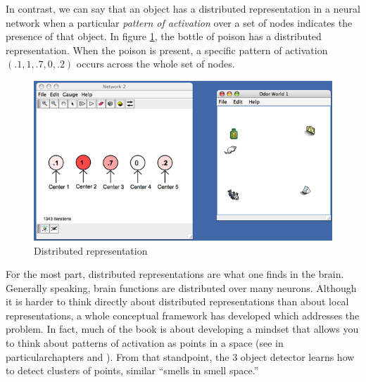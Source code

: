 In contrast, we can say that an object has a distributed representation in a neural network when a particular {\em pattern of activation} over a set of nodes indicates the presence of that object. In figure \ref{distributed},  the bottle of poison has a distributed representation. When the poison is present, a specific pattern of activation $(.1,1,.7,0,.2)$ occurs across the whole set of nodes.

\begin{figure}[h]
\centering
\includegraphics[scale=.3]{./images/Distributed_Rep.png}
\caption{Distributed representation}
\label{distributed}
\end{figure}

For the most part, distributed representations are what one finds in the brain. Generally speaking, brain functions are distributed over many neurons. Although it is harder to think directly about distributed representations than about local representations, a whole conceptual framework has developed which addresses the problem. In fact, much of the book is about developing a mindset that allows you to think about patterns of activation as points in a space (see in particularchapters  and ).  From that standpoint, the 3 object detector learns how to detect clusters of points, similar ``smells in smell space.'' 
